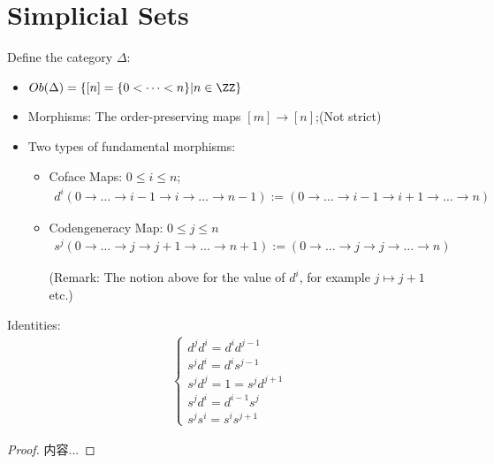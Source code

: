\documentclass[Total.tex]{subfiles}
\begin{document}
				\section{Simplicial Sets}
			\begin{Def}
				Define the category $\Delta$:
				\begin{itemize}
					\item $Ob(\Delta)=\{[n]=\{0<\dots<n\}|n\in \ZZ\}$
					\item Morphisms: The order-preserving maps $[m]\rightarrow [n]$;(Not strict)
					\item Two types of fundamental morphisms:
					\begin{itemize}
						\item Coface Maps: $0\leq i\leq n$;
						\begin{gather*}
							d^i(0\rightarrow\dots\rightarrow i-1\rightarrow i\rightarrow\dots\rightarrow n-1):=(0\rightarrow \dots \rightarrow i-1\rightarrow i+1\rightarrow\dots\rightarrow n)
						\end{gather*}
						\item Codengeneracy Map: $0\leq j\leq n$
						\begin{gather*}
							s^j(0\rightarrow \dots\rightarrow j\rightarrow j+1\rightarrow\dots\rightarrow n+1):=(0\rightarrow\dots\rightarrow j\rightarrow  j\rightarrow\dots\rightarrow n)
						\end{gather*}
						
						(Remark: The notion above for the value of $d^i$, for example $j\mapsto j+1$ etc.)
					\end{itemize}
				\end{itemize}
			\end{Def}
			
			\begin{proposition}
				Identities:
				\begin{gather*}
					\begin{cases}
						d^jd^i=d^id^{j-1}\\
						s^jd^i=d^is^{j-1}\\
						s^jd^j=1=s^jd^{j+1}\\
						s^jd^i=d^{i-1}s^j\\
						s^js^i=s^is^{j+1}
					\end{cases}
				\end{gather*}
			\end{proposition}
			\begin{proof}
				内容...
			\end{proof}
			
\end{document}
